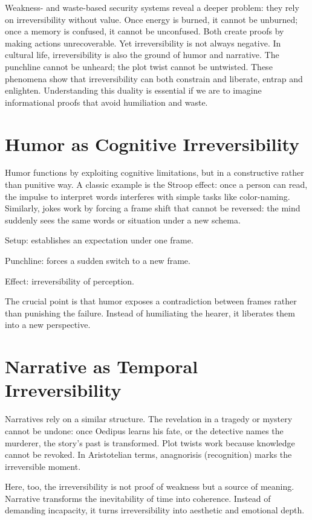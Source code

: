 \documentclass{book}
\begin{document}
Weakness- and waste-based security systems reveal a deeper problem: they rely on irreversibility without value. Once energy is burned, it cannot be unburned; once a memory is confused, it cannot be unconfused. Both create proofs by making actions unrecoverable. Yet irreversibility is not always negative. In cultural life, irreversibility is also the ground of humor and narrative. The punchline cannot be unheard; the plot twist cannot be untwisted. These phenomena show that irreversibility can both constrain and liberate, entrap and enlighten. Understanding this duality is essential if we are to imagine informational proofs that avoid humiliation and waste.

\section{Humor as Cognitive Irreversibility}

Humor functions by exploiting cognitive limitations, but in a constructive rather than punitive way. A classic example is the Stroop effect: once a person can read, the impulse to interpret words interferes with simple tasks like color-naming. Similarly, jokes work by forcing a frame shift that cannot be reversed: the mind suddenly sees the same words or situation under a new schema.

Setup: establishes an expectation under one frame.

Punchline: forces a sudden switch to a new frame.

Effect: irreversibility of perception.

The crucial point is that humor exposes a contradiction between frames rather than punishing the failure. Instead of humiliating the hearer, it liberates them into a new perspective.

\section{Narrative as Temporal Irreversibility}

Narratives rely on a similar structure. The revelation in a tragedy or mystery cannot be undone: once Oedipus learns his fate, or the detective names the murderer, the story’s past is transformed. Plot twists work because knowledge cannot be revoked. In Aristotelian terms, anagnorisis (recognition) marks the irreversible moment.

Here, too, the irreversibility is not proof of weakness but a source of meaning. Narrative transforms the inevitability of time into coherence. Instead of demanding incapacity, it turns irreversibility into aesthetic and emotional depth.
\end{document}
